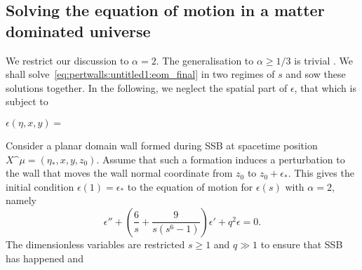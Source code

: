 \begin{draft}

\subsection{Solving the equation of motion in a matter dominated universe}
We restrict our discussion to $\alpha=2$. The generalisation to $\alpha \geq 1/3$ is trivial . We shall solve~\cref{eq:pertwalls:untitled1:eom_final} in two regimes of $s$ and sow these solutions together. In the following, we neglect the spatial part of $\epsilon$, that which is subject to 

$\epsilon(\eta, x, y) =$


Consider a planar domain wall formed during SSB at spacetime position $X\^\mu= (\eta_\ast, x, y, z_0)$.
Assume that such a formation induces a perturbation to the wall that moves the wall normal coordinate from $z_0$ to $z_0 + \epsilon_\ast$. This gives the initial condition $\epsilon(1)=\epsilon_\ast$ to the equation of motion for $\epsilon(s)$ with $\alpha=2$, namely
\begin{equation}\label{eq:pertwalls:untitled1:eom_MD}
    \epsilon'' + \left( \frac{6}{s}  +\frac{9}{s\left(s^6-1\right)} \right) \epsilon' + q^2 \epsilon = 0.
\end{equation}
The dimensionless variables are restricted $s\geq 1$ and $q\gg 1$ to ensure that SSB has happened and 


\end{draft}
